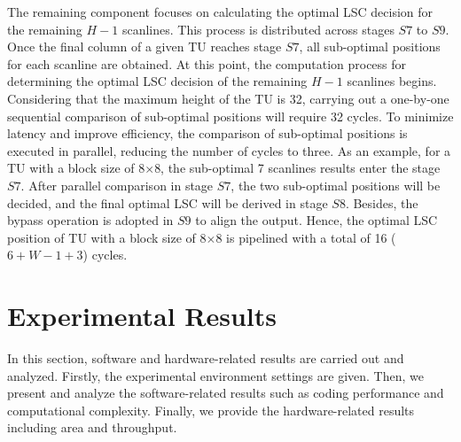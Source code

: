 \documentclass[lettersize,journal]{IEEEtran}
\begin{document}
The remaining component focuses on calculating the optimal LSC decision for the remaining $H-1$ scanlines. This process is distributed across stages $S7$ to $S9$. 
Once the final column of a given TU reaches stage $S7$, all sub-optimal positions for each scanline are obtained. 
At this point, the computation process for determining the optimal LSC decision of the remaining $H-1$ scanlines begins. 
Considering that the maximum height of the TU is 32, carrying out a one-by-one sequential comparison of sub-optimal positions will require 32 cycles. 
To minimize latency and improve efficiency, the comparison of sub-optimal positions is executed in parallel, reducing the number of cycles to three. 
As an example, for a TU with a block size of 8$\times$8, the sub-optimal 7 scanlines results enter the stage $S7$. After parallel comparison in stage $S7$, the two sub-optimal positions will be decided, and the final optimal LSC will be derived in stage $S8$. Besides, the bypass operation is adopted in $S9$ to align the output. Hence, the optimal LSC position of TU with a block size of 8$\times$8 is pipelined with a total of 16 ($6 + W - 1 + 3$) cycles. 


\section{Experimental Results}
\label{sec:5}
In this section, software and hardware-related results are carried out and analyzed. Firstly, the experimental environment settings are given. Then, we present and analyze the software-related results such as coding performance and computational complexity. Finally, we provide the hardware-related results including area and throughput. 
\end{document}
